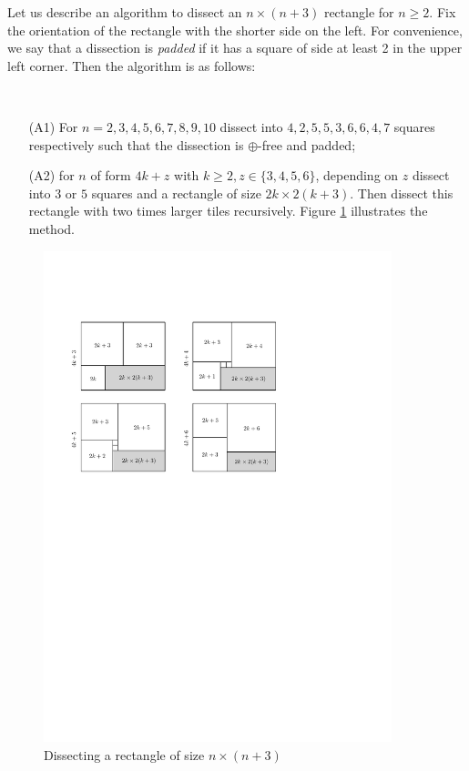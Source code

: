 Let us describe an algorithm to dissect an $n \times (n+3)$ rectangle for $n \geq 2$. Fix the orientation of the rectangle with the shorter side on the left. For convenience, we say that a dissection is \emph{padded} if it has a square of side at least 2 in the upper left corner. Then the algorithm is as follows:

\begin{alg} \ 
\begin{enumerate}
		\item[(A1)] For $n=2,3,4,5,6,7,8,9,10$ dissect into $4,2,5,5,3,6,6,4,7$ squares respectively such that the dissection is $\oplus$-free and padded;
		\item[(A2)] for $n$ of form $4k+z$ with $k \geq 2, z \in \{3,4,5,6\}$, depending on $z$ dissect into $3$ or $5$ squares and a rectangle of size $2k \times 2(k+3)$. Then dissect this rectangle with two times larger tiles recursively. Figure \ref{fig:kk3} illustrates the method.
	\end{enumerate}
\end{alg}%
	
\begin{figure}[htb]
\centering
\includegraphics[width=0.9\textwidth]{img/kk3.pdf}
\caption{Dissecting a rectangle of size $n \times (n+3)$}
\label{fig:kk3}
\end{figure}



